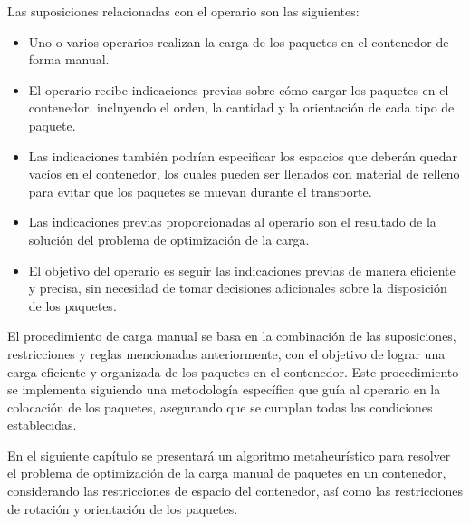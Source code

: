 Las suposiciones relacionadas con el operario son las siguientes:

\begin{itemize}
    \item Uno o varios operarios realizan la carga de los paquetes en el contenedor de forma manual.
    \item El operario recibe indicaciones previas sobre cómo cargar los paquetes en el contenedor, incluyendo el orden, la cantidad y la orientación de cada tipo de paquete.
    \item Las indicaciones también podrían especificar los espacios que deberán quedar vacíos en el contenedor, los cuales pueden ser llenados con material de relleno para evitar que los paquetes se muevan durante el transporte.
    \item Las indicaciones previas proporcionadas al operario son el resultado de la solución del problema de optimización de la carga.
    \item El objetivo del operario es seguir las indicaciones previas de manera eficiente y precisa, sin necesidad de tomar decisiones adicionales sobre la disposición de los paquetes.
\end{itemize}

El procedimiento de carga manual se basa en la combinación de las suposiciones, restricciones y reglas mencionadas anteriormente, con el objetivo de lograr una carga eficiente y organizada de los paquetes en el contenedor. Este procedimiento se implementa siguiendo una metodología específica que guía al operario en la colocación de los paquetes, asegurando que se cumplan todas las condiciones establecidas.

En el siguiente capítulo se presentará un algoritmo metaheurístico para resolver el problema de optimización de la carga manual de paquetes en un contenedor, considerando las restricciones de espacio del contenedor, así como las restricciones de rotación y orientación de los paquetes.
